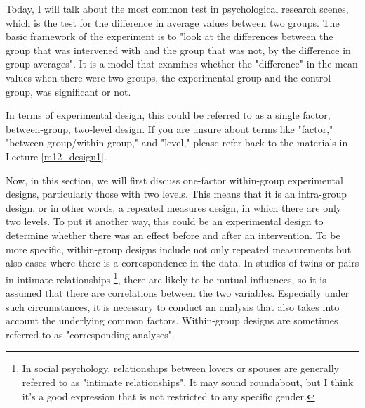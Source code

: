 \documentclass{ltjsbook}
\begin{document}
Today, I will talk about the most common test in psychological research scenes, which is the test for the difference in average values between two groups.
The basic framework of the experiment is to "look at the differences between the group that was intervened with and the group that was not, by the difference in group averages". It is a model that examines whether the "difference" in the mean values when there were two groups, the experimental group and the control group, was significant or not.

In terms of experimental design, this could be referred to as a single factor, between-group, two-level design. If you are unsure about terms like "factor," "between-group/within-group," and "level," please refer back to the materials in Lecture \ref{m12_design1}.

Now, in this section, we will first discuss one-factor within-group experimental designs, particularly those with two levels. This means that it is an intra-group design, or in other words, a repeated measures design, in which there are only two levels. To put it another way, this could be an experimental design to determine whether there was an effect before and after an intervention. To be more specific, within-group designs include not only repeated measurements but also cases where there is a correspondence in the data. In studies of twins or pairs in intimate relationships \footnote{In social psychology, relationships between lovers or spouses are generally referred to as "intimate relationships". It may sound roundabout, but I think it's a good expression that is not restricted to any specific gender.}, there are likely to be mutual influences, so it is assumed that there are correlations between the two variables. Especially under such circumstances, it is necessary to conduct an analysis that also takes into account the underlying common factors. Within-group designs are sometimes referred to as "corresponding analyses".
\end{document}
